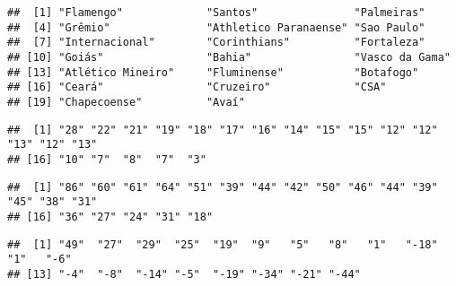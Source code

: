 \documentclass[
]{book}
\newenvironment{Shaded}{\begin{snugshade}}{\end{snugshade}}
\newcommand{\CommentTok}[1]{\textcolor[rgb]{0.56,0.35,0.01}{\textit{#1}}}
\newcommand{\FloatTok}[1]{\textcolor[rgb]{0.00,0.00,0.81}{#1}}
\newcommand{\NormalTok}[1]{#1}
\newcommand{\SpecialCharTok}[1]{\textcolor[rgb]{0.00,0.00,0.00}{#1}}
\begin{document}
\begin{verbatim}
##  [1] "Flamengo"             "Santos"               "Palmeiras"           
##  [4] "Grêmio"               "Athletico Paranaense" "Sao Paulo"           
##  [7] "Internacional"        "Corinthians"          "Fortaleza"           
## [10] "Goiás"                "Bahia"                "Vasco da Gama"       
## [13] "Atlético Mineiro"     "Fluminense"           "Botafogo"            
## [16] "Ceará"                "Cruzeiro"             "CSA"                 
## [19] "Chapecoense"          "Avaí"
\end{verbatim}

\begin{Shaded}
\end{Shaded}

\begin{verbatim}
##  [1] "28" "22" "21" "19" "18" "17" "16" "14" "15" "15" "12" "12" "13" "12" "13"
## [16] "10" "7"  "8"  "7"  "3"
\end{verbatim}

\begin{Shaded}
\end{Shaded}

\begin{verbatim}
##  [1] "86" "60" "61" "64" "51" "39" "44" "42" "50" "46" "44" "39" "45" "38" "31"
## [16] "36" "27" "24" "31" "18"
\end{verbatim}

\begin{Shaded}
\end{Shaded}

\begin{verbatim}
##  [1] "49"  "27"  "29"  "25"  "19"  "9"   "5"   "8"   "1"   "-18" "1"   "-6" 
## [13] "-4"  "-8"  "-14" "-5"  "-19" "-34" "-21" "-44"
\end{verbatim}
\end{document}
